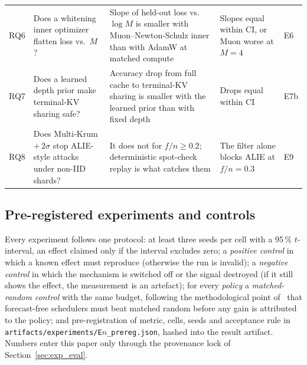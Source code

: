 \documentclass[11pt,a4paper]{article}
\begin{document}
\begin{table}[htbp!]
{\begin{tabular}{@{}lp{4.0cm}p{5.2cm}p{4.6cm}l@{}}
RQ6 & Does a whitening inner optimizer flatten loss vs.\ $M$?~\cite{belilovsky2026inner,therien2025muloco} & Slope of held-out loss vs.\ $\log M$ is smaller with Muon--Newton-Schulz inner than with AdamW at matched compute & Slopes equal within CI, or Muon worse at $M=4$ & E6 \\
RQ7 & Does a learned depth prior make terminal-KV sharing safe?~\cite{loopedfp2026} & Accuracy drop from full cache to terminal-KV sharing is smaller with the learned prior than with fixed depth & Drops equal within CI & E7b \\
RQ8 & Does Multi-Krum $+\,2\sigma$ stop ALIE-style attacks under non-IID shards? & It does not for $f/n \ge 0.2$; deterministic spot-check replay is what catches them & The filter alone blocks ALIE at $f/n=0.3$ & E9 \\
\bottomrule
\end{tabular}%
}
\end{table}

\subsection{Pre-registered experiments and controls}

Every experiment follows one protocol: at least three seeds per cell with a 95\,\% $t$-interval, an effect claimed only if the interval excludes zero; a \emph{positive control} in which a known effect must reproduce (otherwise the run is invalid); a \emph{negative control} in which the mechanism is switched off or the signal destroyed (if it still shows the effect, the measurement is an artefact); for every \emph{policy} a \emph{matched-random control} with the same budget, following the methodological point of~\cite{twelftree2026wadiloco} that forecast-free schedulers must beat matched random before any gain is attributed to the policy; and pre-registration of metric, cells, seeds and acceptance rule in \texttt{artifacts/experiments/E$n$\_prereg.json}, hashed into the result artifact. Numbers enter this paper only through the provenance lock of Section~\ref{sec:exp_eval}.
\end{document}
